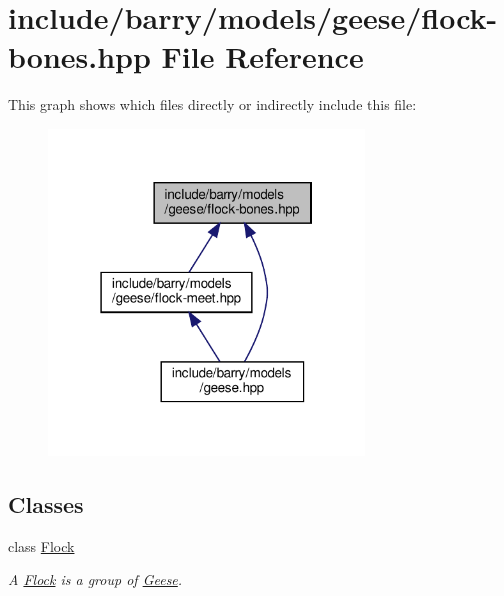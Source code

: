 \hypertarget{flock-bones_8hpp}{}\section{include/barry/models/geese/flock-\/bones.hpp File Reference}
\label{flock-bones_8hpp}
This graph shows which files directly or indirectly include this file\+:
\nopagebreak
\begin{figure}[H]
\begin{center}
\leavevmode
\includegraphics[width=238pt]{flock-bones_8hpp__dep__incl}
\end{center}
\end{figure}
\subsection*{Classes}
\begin{DoxyCompactItemize}
\item 
class \hyperlink{class_flock}{Flock}
\begin{DoxyCompactList}\small\item\em A \hyperlink{class_flock}{Flock} is a group of \hyperlink{class_geese}{Geese}. \end{DoxyCompactList}\end{DoxyCompactItemize}
